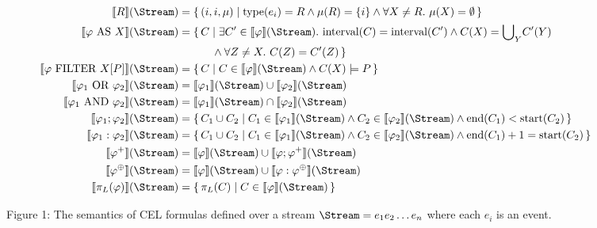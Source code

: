 \begin{figure}[t]
\[
\begin{aligned}
	\text{\textlbrackdbl} R \text{\textrbrackdbl}(\Stream) 
	&= \{\, (i, i, \mu)
	\mid \text{type}(e_i) = R 
	\land \mu(R) = \{i\} 
	\land \forall X \neq R.\ \mu(X) = \emptyset \,\} \\
	\text{\textlbrackdbl} \varphi\ \text{AS}\ X \text{\textrbrackdbl}(\Stream) 
	&= \{\, C 
	\mid \exists C' \in \text{\textlbrackdbl} \varphi \text{\textrbrackdbl}(\Stream).\
	\text{interval}(C) = \text{interval}(C') 
	\land C(X) = {\bigcup}_Y C'(Y) \\& \hspace{30pt}	
	\land \forall Z \neq X.\ C(Z) = C'(Z) \,\} \\
	\text{\textlbrackdbl} \varphi\ \text{FILTER}\ X[P] \text{\textrbrackdbl}(\Stream) 
	&= \{\, C 
	\mid C \in \text{\textlbrackdbl} \varphi \text{\textrbrackdbl}(\Stream) 
	\land C(X) \models P \,\} \\
	\text{\textlbrackdbl} \varphi_1\ \text{OR}\ \varphi_2 \text{\textrbrackdbl}(\Stream) 
	&= \text{\textlbrackdbl} \varphi_1 \text{\textrbrackdbl}(\Stream) 
	\cup 
	\text{\textlbrackdbl} \varphi_2 \text{\textrbrackdbl}(\Stream) \\
	\text{\textlbrackdbl} \varphi_1\ \text{AND}\ \varphi_2 \text{\textrbrackdbl}(\Stream) 
	&= \text{\textlbrackdbl} \varphi_1 \text{\textrbrackdbl}(\Stream) 
	\cap 
	\text{\textlbrackdbl} \varphi_2 \text{\textrbrackdbl}(\Stream) \\
	\text{\textlbrackdbl} \varphi_1 ; \varphi_2 \text{\textrbrackdbl}(\Stream) 
	&= \{\, C_1 \cup C_2 
	\mid C_1 \in \text{\textlbrackdbl} \varphi_1 \text{\textrbrackdbl}(\Stream) 
	\land C_2 \in \text{\textlbrackdbl} \varphi_2 \text{\textrbrackdbl}(\Stream)
	\land \text{end}(C_1) < \text{start}(C_2) \,\} \\
	\text{\textlbrackdbl} \varphi_1 : \varphi_2 \text{\textrbrackdbl}(\Stream) 
	&= \{\, C_1 \cup C_2 
	\mid C_1 \in \text{\textlbrackdbl} \varphi_1 \text{\textrbrackdbl}(\Stream) 
	\land C_2 \in \text{\textlbrackdbl} \varphi_2 \text{\textrbrackdbl}(\Stream)
	\land \text{end}(C_1) + 1 = \text{start}(C_2) \,\} \\
	\text{\textlbrackdbl} \varphi^{+} \text{\textrbrackdbl}(\Stream) 
	&= \text{\textlbrackdbl} \varphi \text{\textrbrackdbl}(\Stream) 
	\cup 
	\text{\textlbrackdbl} \varphi ; \varphi^{+} \text{\textrbrackdbl}(\Stream) \\
	\text{\textlbrackdbl} \varphi^{\oplus} \text{\textrbrackdbl}(\Stream) 
	&= \text{\textlbrackdbl} \varphi \text{\textrbrackdbl}(\Stream) 
	\cup 
	\text{\textlbrackdbl} \varphi : \varphi^{\oplus} \text{\textrbrackdbl}(\Stream) \\
	\text{\textlbrackdbl} \pi_{L}(\varphi) \text{\textrbrackdbl}(\Stream) 
	&= \{\, \pi_L(C) 
	\mid C \in \text{\textlbrackdbl} \varphi \text{\textrbrackdbl}(\Stream) \,\}
\end{aligned}
\]

\caption{Figure 1: The semantics of CEL formulas defined over a stream $\Stream = e_1 e_2\dots e_n$ where each $e_i$ is an event.}
\end{figure}

